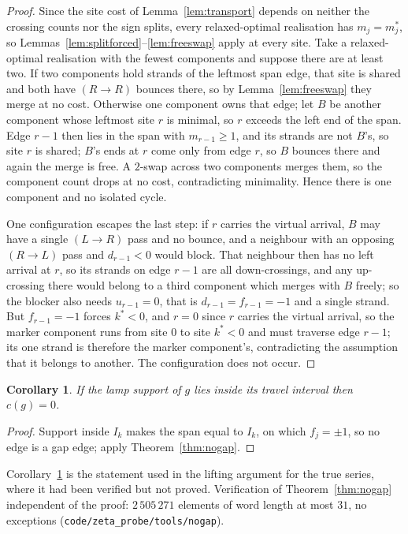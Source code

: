 \documentclass[11pt]{article}
\theoremstyle{plain}
\newtheorem{corollary}[theorem]{Corollary}
\theoremstyle{definition}
\theoremstyle{remark}
\begin{document}
\begin{proof}
Since the site cost of Lemma~\ref{lem:transport} depends on neither the crossing counts nor the
sign splits, every relaxed-optimal realisation has $m_j=m_j^\ast$, so
Lemmas~\ref{lem:splitforced}--\ref{lem:freeswap} apply at every site. Take a relaxed-optimal
realisation with the fewest components and suppose there are at least two. If two components hold
strands of the leftmost span edge, that site is shared and both have $(R\to R)$ bounces there, so by
Lemma~\ref{lem:freeswap} they merge at no cost. Otherwise one component owns that edge; let $B$ be
another component whose leftmost site $r$ is minimal, so $r$ exceeds the left end of the span. Edge
$r-1$ then lies in the span with $m_{r-1}\ge1$, and its strands are not $B$'s, so site $r$ is
shared; $B$'s ends at $r$ come only from edge $r$, so $B$ bounces there and again the merge is free.
A $2$-swap across two components merges them, so the component count drops at no cost, contradicting
minimality. Hence there is one component and no isolated cycle.

One configuration escapes the last step: if $r$ carries the virtual arrival, $B$ may have a single
$(L\to R)$ pass and no bounce, and a neighbour with an opposing $(R\to L)$ pass and $d_{r-1}<0$ would
block. That neighbour then has no left arrival at $r$, so its strands on edge $r-1$ are all
down-crossings, and any up-crossing there would belong to a third component which merges with $B$
freely; so the blocker also needs $u_{r-1}=0$, that is $d_{r-1}=f_{r-1}=-1$ and a single strand. But
$f_{r-1}=-1$ forces $k^\ast<0$, and $r=0$ since $r$ carries the virtual arrival, so the marker
component runs from site $0$ to site $k^\ast<0$ and must traverse edge $r-1$; its one strand is
therefore the marker component's, contradicting the assumption that it belongs to another. The
configuration does not occur.
\end{proof}

\begin{corollary}\label{cor:localzero}
If the lamp support of $g$ lies inside its travel interval then $c(g)=0$.
\end{corollary}

\begin{proof}
Support inside $I_k$ makes the span equal to $I_k$, on which $f_j=\pm1$, so no edge is a gap edge;
apply Theorem~\ref{thm:nogap}.
\end{proof}

Corollary~\ref{cor:localzero} is the statement used in the lifting argument for the true series, where it
had been verified but not proved. Verification of Theorem~\ref{thm:nogap} independent of the proof:
$2\,505\,271$ elements of word length at most $31$, no exceptions
(\texttt{code/zeta\_probe/tools/nogap}).
\end{document}
